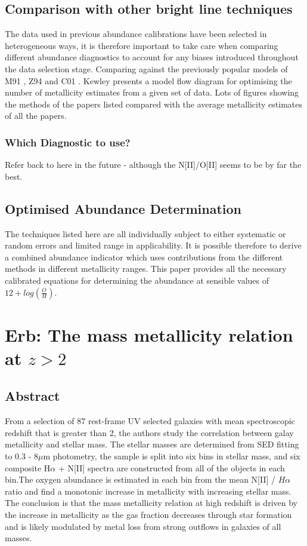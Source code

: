 \documentclass{literature}
\begin{document}
\subsection{Comparison with other bright line techniques}
The data used in previous abundance calibrations have been selected in heterogeneous ways, it is therefore important to take care when comparing different abundance diagnostics to account for any biases introduced throughout the data selection stage. Comparing against the previously popular models of M91 \citep{McGaugh_1991}, Z94 \citep{Zaritsky_1994} and C01 \citep{Charlot_2001}. Kewley presents a model flow diagram for optimising the number of metallicity estimates from a given set of data. Lots of figures showing the methods of the papers listed compared with the average metallicity estimates of all the papers.

\subsubsection{Which Diagnostic to use?} 
Refer back to here in the future - although the N[II]/O[II] seems to be by far the best.

\subsection{Optimised Abundance Determination}
The techniques listed here are all individually subject to either systematic or random errors and limited range in applicability. It is possible therefore to derive a combined abundance indicator which uses contributions from the different methods in different metallicity ranges. This paper provides all the necessary calibrated equations for determining the abundance at sensible values of $12 + log(\frac{O}{H})$. 





\section{Erb: The mass metallicity relation at $z > 2$}\label{sec:erb}
\subsection{Abstract}
\citep{Erb_2006} From a selection of 87 rest-frame UV selected galaxies with mean spectroscopic redshift that is greater than 2, the authors study the correlation between galay metallicity and stellar mass. The stellar masses are determined from SED fitting to 0.3 - 8$\mu$m photometry, the sample is split into six bins in stellar mass, and six composite H$\alpha$ + N[II] spectra are constructed from all of the objects in each bin.The oxygen abundance is estimated in each bin from the mean N[II] / $H\alpha$ ratio and find a monotonic increase in metallicity with increasing stellar mass. The conclusion is that the mass metallicity relation at high redshift is driven by the increase in metallicity as the gas fraction decreases through star formation and is likely modulated by metal loss from strong outflows in galaxies of all masses.
\end{document}
